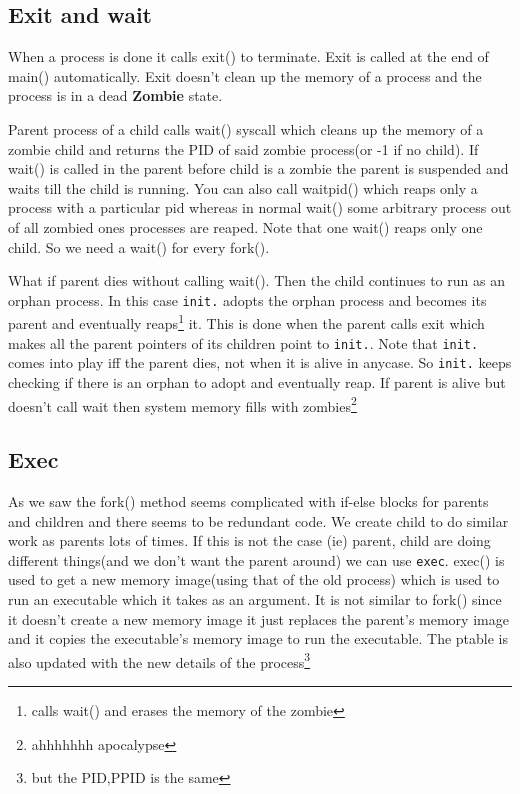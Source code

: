 \documentclass[12pt]{article}
\begin{document}
\subsection{Exit and wait}
When a process is done it calls exit() to terminate. Exit is called at the end of main() automatically.
Exit doesn't clean up the memory of a process and the process is in a dead \textbf{Zombie} state.

Parent process of a child calls wait() syscall which cleans up the memory of a zombie child and returns the PID of said zombie process(or -1 if no child). If wait() is called in the
parent before child is a zombie the parent is suspended and waits till the child is 
running. You can also call waitpid() which reaps only a process with a particular pid whereas in normal 
wait() some arbitrary process out of all zombied ones processes are reaped. Note that one wait() reaps only one child. So we need a wait() for every fork().


What if parent dies without calling wait(). Then the child continues to run as an orphan process. In this case \texttt{init.} 
adopts the orphan process and becomes its parent and eventually reaps\footnote{calls wait() and erases the memory of the zombie} it. This is done when the parent calls exit which makes all the parent
pointers of its children point to \texttt{init.}. Note that \texttt{init.} comes into play iff the parent dies, not when it is alive in anycase. So \texttt{init.} keeps
checking if there is an orphan to adopt and eventually reap. If parent is alive but doesn't call wait then system memory fills with zombies\footnote{ahhhhhhh apocalypse}


\subsection{Exec}
As we saw the fork() method seems complicated with if-else blocks for parents and children and there seems to be redundant code. We create
child to do similar work as parents lots of times. If this is not the case (ie) parent, child are doing different things(and we don't want the parent around) we can use \texttt{exec}.
exec() is used to get a new memory image(using that of the old process) which is used to run an executable which it takes as an argument. It is not similar to fork() since it doesn't create a new memory image
it just replaces the parent's memory image and it copies the executable's memory image to run the executable. The ptable is also updated with the new details of the process\footnote{but the PID,PPID is the same}
\end{document}
